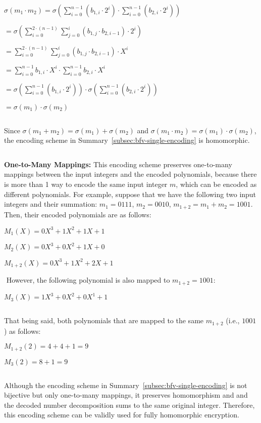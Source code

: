 $ $

$\sigma (m_1 \cdot m_2) = \sigma\left(\sum\limits_{i=0}^{n-1}(b_{1, i} \cdot 2^i) \cdot \sum\limits_{i=0}^{n-1}(b_{2,i} \cdot 2^i)\right)$

$= \sigma\left(\sum\limits_{i=0}^{2\cdot(n-1)}\sum\limits_{j=0}^{i}(b_{1,j} \cdot b_{2,i-1})\cdot 2^i\right)$

$= \sum\limits_{i=0}^{2\cdot(n-1)}\sum\limits_{j=0}^{i}(b_{1,j} \cdot b_{2,i-1})\cdot X^i$

$ = \sum\limits_{i=0}^{n-1} b_{1,i}\cdot X^i \cdot \sum\limits_{i=0}^{n-1} b_{2,i}\cdot X^i$

$= \sigma\left( \sum\limits_{i=0}^{n-1} (b_{1,i} \cdot 2^i)\right) \cdot \sigma\left( \sum\limits_{i=0}^{n-1} (b_{2,i} \cdot 2^i) \right)$

$= \sigma(m_1) \cdot \sigma(m_2)$

$ $

Since $\sigma (m_1 + m_2) = \sigma(m_1) + \sigma(m_2)$ and $\sigma (m_1 \cdot m_2) = \sigma(m_1) \cdot \sigma(m_2)$, the encoding scheme in Summary~\ref*{subsec:bfv-single-encoding} is homomorphic.


$ $

\textbf{One-to-Many Mappings:} This encoding scheme preserves one-to-many mappings between the input integers and the encoded polynomials, because there is more than 1 way to encode the same input integer $m$, which can be encoded as different polynomials. For example, suppose that we have the following two input integers and their summation: $m_1 = 0111$, $m_2 = 0010$, $m_{1+2} = m_1 + m_2 = 1001$. Then, their encoded polynomials are as follows: 

$M_1(X) = 0X^3 + 1X^2 + 1X + 1$

$M_2(X) = 0X^3 + 0X^2 + 1X + 0$

$M_{1+2}(X) = 0X^3 + 1X^2 + 2X + 1$

$ $
However, the following polynomial is also mapped to $m_{1+2} = 1001$:

$M_{3}(X) = 1X^3 + 0X^2 + 0X^1 + 1$

$ $

That being said, both polynomials that are mapped to the same $m_{1+2}$ (i.e., $1001$) as follows:

$M_{1+2}(2) = 4 + 4 + 1 = 9$

$M_{3}(2) = 8 + 1 = 9$

$ $

Although the encoding scheme in Summary~\ref*{subsec:bfv-single-encoding} is not bijective but only one-to-many mappings, it preserves homomorphism and and the decoded number decomposition sums to the same original integer. Therefore, this encoding scheme can be validly used for fully homomorphic encryption.


